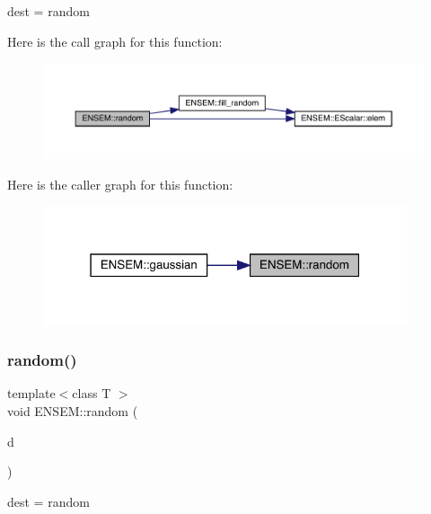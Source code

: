dest = random 

Here is the call graph for this function\+:\nopagebreak
\begin{figure}[H]
\begin{center}
\leavevmode
\includegraphics[width=350pt]{d2/d94/namespaceENSEM_a207bad99cb32c3dd005cf6c6538f2ada_cgraph}
\end{center}
\end{figure}
Here is the caller graph for this function\+:\nopagebreak
\begin{figure}[H]
\begin{center}
\leavevmode
\includegraphics[width=304pt]{d2/d94/namespaceENSEM_a207bad99cb32c3dd005cf6c6538f2ada_icgraph}
\end{center}
\end{figure}
\mbox{\label{namespaceENSEM_a7e217f3d73216cb71b6221611387c805}} 
\subsubsection{\texorpdfstring{random()}{random()}\hspace{0.1cm}{\footnotesize\ttfamily [2/2]}}
{\footnotesize\ttfamily template$<$class T $>$ \\
void E\+N\+S\+E\+M\+::random (\begin{DoxyParamCaption}\item[{\mbox{\hyperlink{classENSEM_1_1Ensem}{Ensem}}$<$ T $>$ \&}]{d }\end{DoxyParamCaption})}



dest = random 

